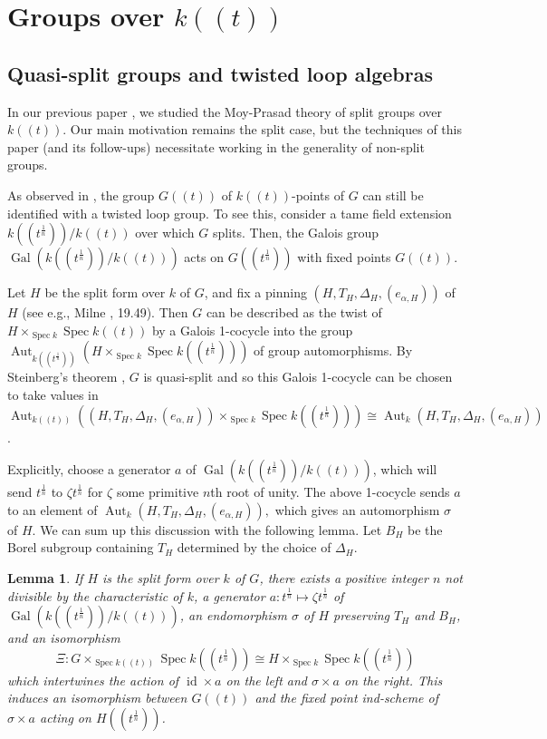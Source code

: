\documentclass[12pt]{article}
\newcommand{\on}{\operatorname}
\DeclareMathOperator{\Spec}{Spec}
\newtheorem{lemma}[theorem]{Lemma}
\theoremstyle{remark}
\begin{document}
\section{Groups over $k((t))$}\label{s:prelim}

\subsection{Quasi-split groups and twisted loop algebras}

In our previous paper \cite{yangMP}, we studied the Moy-Prasad theory of split groups over $k((t))$. Our main motivation remains the split case, but the techniques of this paper (and its follow-ups) necessitate working in the generality of non-split groups.

As observed in \cite{pappasrapoport}, the group $G((t))$ of $k((t))$-points of $G$ can still be identified with a twisted loop group. To see this, consider a tame field extension $k((t^{\frac{1}{n}}))/k((t))$ over which $G$ splits. Then, the Galois group $\on{Gal}(k((t^{\frac{1}{n}}))/k((t)))$ acts on $G((t^{\frac{1}{n}}))$ with fixed points $G((t))$.

Let $H$ be the split form over $k$ of $G$, and fix a pinning $(H,T_H,\Delta_H,(e_{\alpha,H}))$ of $H$ (see e.g., Milne \cite{milneRG}, 19.49). Then $G$ can be described as the twist of $H\times_{\Spec k}\Spec k((t))$ by a Galois 1-cocycle into the group $\on{Aut}_{k((t^{\frac{1}{n}}))}(H\times_{\Spec k}\Spec k((t^{\frac{1}{n}})))$ of group automorphisms. By Steinberg's theorem \cite{steinberg}, $G$ is quasi-split and so this Galois 1-cocycle can be chosen to take values in $\on{Aut}_{k((t))}((H,T_H,\Delta_H,(e_{\alpha,H}))\times_{\Spec k}\Spec k((t^{\frac{1}{n}})))\cong \on{Aut}_{k}(H,T_H,\Delta_H,(e_{\alpha,H}))$.

Explicitly, choose a generator $a$ of $\on{Gal}(k((t^{\frac{1}{n}}))/k((t)))$, which will send $t^{\frac{1}{n}}$ to $\zeta t^{\frac{1}{n}}$ for $\zeta$ some primitive $n$th root of unity. The above 1-cocycle sends $a$ to an element of $\on{Aut}_{k}(H,T_H,\Delta_H,(e_{\alpha,H})),$ which gives an automorphism $\sigma$ of $H$. We can sum up this discussion with the following lemma. Let $B_H$ be the Borel subgroup containing $T_H$ determined by the choice of $\Delta_H$. 

\begin{lemma}\label{twistedaffinegroup}
If $H$ is the split form over $k$ of $G$, there exists a positive integer $n$ not divisible by the characteristic of $k$, a generator $a:t^{\frac{1}{n}}\mapsto\zeta t^{\frac{1}{n}}$ of $\on{Gal}(k((t^{\frac{1}{n}}))/k((t)))$, an endomorphism $\sigma$ of $H$ preserving $T_H$ and $B_H$, and an isomorphism
\[
\Xi:G\times_{\on{Spec}k((t))}\on{Spec}k((t^{\frac{1}{n}}))\cong H\times_{\on{Spec}k}\on{Spec}k((t^{\frac{1}{n}}))
\]
which intertwines the action of $\on{id}\times a$ on the left and $\sigma\times a$ on the right. This induces an isomorphism between $G((t))$ and the fixed point ind-scheme of $\sigma\times a$ acting on $H((t^\frac{1}{n}))$.
\end{lemma}
\end{document}
